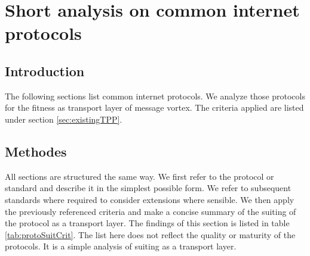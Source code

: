 \documentclass[a4paper,appendixprefix,pdfusetitle,twocolumn,fontsize=8pt,draft,DIV=calc]{scrbook}
\begin{document}
\mainmatter







\onecolumn
\appendix
{}%
\renewcommand*{\thepage}{A\arabic{page}}



\gdef\rfc{../../../../rfc/src/xml2rfc/draft-gwerder-messagevortexmain-04.pdf}
%



\twocolumn\clearpage
\chapter{Short analysis on common internet protocols\label{app:transportProtocols}}

\section{Introduction}
The following sections list common internet protocols. We analyze those protocols for the fitness as transport layer of message vortex. The criteria applied are listed under section \ref{sec:existingTPP}.

\section{Methodes}
All sections are structured the same way. We first refer to the protocol or standard and describe it in the simplest possible form. We refer to subsequent standards where required to consider extensions where sensible. We then apply the previously referenced criteria and make a concise summary of the suiting of the protocol as a transport layer. The findings of this section is listed in table \ref{tab:protoSuitCrit}. The list here does not reflect the quality or maturity of the protocols. It is a simple analysis of suiting as a transport layer.
\end{document}
